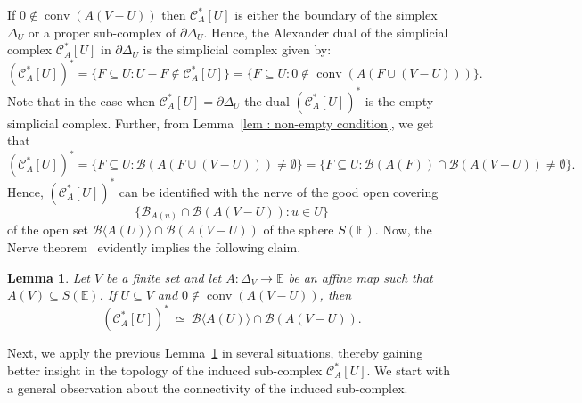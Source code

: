 \documentclass[a4paper,11pt,reqno, english]{amsart}
\newtheorem{lemma}[theorem]{Lemma}
\theoremstyle{definition}
\theoremstyle{remark}
\newcommand\CC{\mathscr C}
\newcommand\E{\mathbb{E}}
\DeclareMathOperator{\conv}{\mathrm{conv}}
\begin{document}
\medskip
If $0\notin\conv (A(V-U))$ then $\CC_A^*[U]$ is either the boundary of the simplex $\Delta_U$ or a proper
sub-complex of $\partial\Delta_U$.
Hence, the Alexander dual of the simplicial complex $\CC_A^*[U]$ in $\partial\Delta_U$ is the simplicial complex given by:
\begin{equation}
	\label{eq : dual of dual 01}
	(\CC_A^*[U])^*=\{ F\subseteq U : U-F\notin \CC_A^*[U]\} = \{ F\subseteq U : 0\notin \conv (A(F\cup (V-U)))\}.
\end{equation}
Note that in the case when $\CC_A^*[U]=\partial\Delta_U$ the dual $(\CC_A^*[U])^*$ is the empty simplicial complex.
Further, from Lemma~\ref{lem : non-empty condition}, we get that
\begin{equation}
	\label{eq : dual of dual 02}
	(\CC_A^*[U])^*=  \{ F\subseteq U : \mathscr{B}(A(F\cup (V-U)))\neq \emptyset\}= \{ F\subseteq U : \mathscr{B}(A(F))\cap \mathscr{B}(A(V-U))\neq \emptyset\}.
\end{equation}
Hence, $(\CC_{A}^*[U])^*$ can be identified with the nerve of the good open covering
\[\{\mathscr{B}_{A(u)}\cap \mathscr{B}(A(V-U)) : u\in U\}\]
of the open set $\mathscr{B}\langle A(U)\rangle\cap \mathscr{B}(A(V-U))$ of the sphere $S(\E)$.
Now, the  Nerve theorem~\cite[Cor.\,4G.3]{Hatcher2002} evidently implies the following claim.

\medskip
\begin{lemma}
	\label{lem : topology of induced sub-complexes 03 }
	Let $V$ be a finite set and let $A\colon \Delta_V\longrightarrow\E$ be an affine map such that $A(V)\subseteq S(\E)$.
	If $U\subseteq V$ and $0\notin\conv(A(V-U))$, then
	\begin{equation}
		\label{eq : dual of dual 03}
		(\CC_A^*[U])^* \ \simeq \ \mathscr{B}\langle A(U)\rangle\cap \mathscr{B}(A(V-U)).
	\end{equation}
\end{lemma}

\medskip
Next, we apply the previous Lemma~\ref{lem : topology of induced sub-complexes 03 } in several situations, thereby gaining better insight in the topology of the induced sub-complex $\CC_A^*[U]$.
We start with a general observation about the connectivity of the induced sub-complex.
\end{document}
